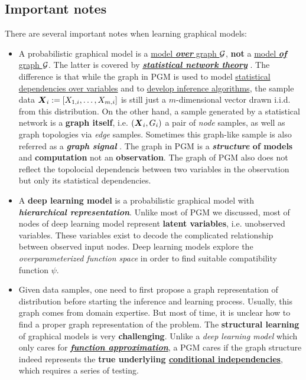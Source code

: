 \documentclass[11pt]{article}
\begin{document}
\subsection{Important notes}
There are several important notes when learning graphical models:
\begin{itemize}
\item A probabilistic graphical model is a \underline{model \emph{\textbf{over}} graph ${\mathcal G}$}, \textbf{not} a \underline{model \emph{\textbf{of}} graph ${\mathcal G}$}. The latter is covered by \underline{\textbf{\emph{statistical network theory}}} \citep{goldenberg2010survey,  jackson2010social, newman2018networks}. The difference is that while the graph in PGM is used to model \underline{statistical} \underline{dependencies over variables} and to \underline{develop inference algorithms}, the sample data $\boldsymbol{X}_{i} := [X_{1,i}, \ldots, X_{m,i}]$ is still just a $m$-dimensional vector drawn i.i.d. from this distribution. On the other hand, a sample generated by a statistical network is a \textbf{graph itself}, i.e. $(\boldsymbol{X}_{i}, G_{i})$ a pair of \emph{node} samples, as well as graph topologies via \emph{edge} samples. Sometimes this graph-like sample is also referred as a \emph{\textbf{graph signal}} \citep{ortega2018graph}. The graph in PGM is a \textbf{\emph{structure} of models} and \textbf{computation} not an \textbf{observation}. The graph of PGM also does not reflect the topolocial dependencis between two variables in the observation but only its statistical dependencies. 

\item A \textbf{deep learning model} \citep{goodfellow2016deep} is a probabilistic graphical model with \textbf{\emph{hierarchical representation}}.  Unlike most of PGM we discussed, most of nodes of deep learning model represent \textbf{latent variables}, i.e. unobserved variables. These variables exist to decode the complicated relationship between observed input nodes. Deep learning models explore the \emph{overparameterized function space} in order to find suitable compatibility function $\psi$.

\item Given data samples, one need to first propose a graph representation of distribution before starting the inference and learning process. Usually, this graph comes from domain expertise. But most of time, it is unclear how to find a proper graph representation of the problem.  The \textbf{structural learning} of graphical models is very \textbf{challenging}. Unlike a \emph{deep learning model} which only cares for \underline{\emph{\textbf{function approximation}}}, a PGM cares if the graph structure indeed represents the \textbf{true underlyiing \underline{conditional independencies}}, which requires a series of testing. 
\end{itemize}
\end{document}
